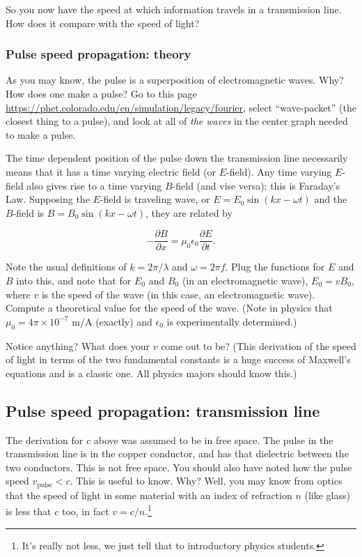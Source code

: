 \documentclass[12pt]{article}
\begin{document}
So you now have the speed at which information travels in a transmission line. How does it compare with the speed of light?

\subsubsection{Pulse speed propagation: theory}

As you may know, the pulse is a superposition of electromagnetic waves. Why? How does one make a pulse? Go to this page \url{https://phet.colorado.edu/en/simulation/legacy/fourier}, select ``wave-packet'' (the closest thing to a pulse), and look at all of {\sl the waves} in the center graph needed to make a pulse.

The time dependent position of the pulse down the transmission line necessarily means that it has a time varying electric field (or $E$-field). Any time varying $E$-field also gives rise to a time varying $B$-field (and vise versa); this is Faraday's Law.  Supposing the $E$-field is traveling wave, or $E=E_0\sin(kx-\omega t)$ and the $B$-field is  $B=B_0\sin(kx-\omega t)$, they are related by

\begin{equation}
-\frac{\partial B}{\partial x}=\mu_0 \epsilon_0 \frac{\partial E}{\partial t}.
\end{equation}

Note the usual definitions of $k=2\pi/\lambda$ and $\omega=2\pi f$.  Plug the functions for $E$ and $B$ into this, and note that for $E_0$ and $B_0$ (in an electromagnetic wave), $E_0=vB_0$, where $v$ is the speed of the wave (in this case, an electromagnetic wave). Compute a theoretical value for the speed of the wave.  (Note in physics that $\mu_0=4\pi\times 10^{-7}$ m/A (exactly) and $\epsilon_0$ is experimentally determined.)

Notice anything? What does your $v$ come out to be? (This derivation of the speed of light in terms of the two fundamental constants is a huge success of Maxwell's equations and is a classic one. All physics majors should know this.)

\subsection{Pulse speed propagation: transmission line}

The derivation for $c$ above was assumed to be in free space.  The pulse in the transmission line is in the copper conductor, and has that dielectric between the two conductors. This is not free space.  You should also have noted how the pulse speed $v_\text{pulse}<c$. This is useful to know. Why? Well, you may know from optics that the speed of light in some material with an index of refraction $n$ (like glass) is less that $c$ too, in fact $v=c/n$.\footnote{It's really not less, we just tell that to introductory physics students.} 
\end{document}
